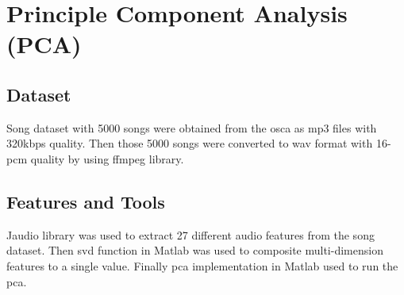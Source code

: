 \section{Principle Component Analysis (PCA)}

\subsection{Dataset}

Song dataset with 5000 songs were obtained from the \ac{osca} as mp3 files with 320kbps quality. Then
those 5000 songs were converted to wav format with 16-pcm quality by using ffmpeg library.

\subsection{Features and Tools}

Jaudio library\cite{jaudio} was used to extract 27 different audio features from the song dataset.
Then \ac{svd} function in Matlab\cite{matlab:2018b} was used to composite multi-dimension features
to a single value. Finally \ac{pca} implementation in Matlab\cite{matlab:2018b} used to run the \ac{pca}. 